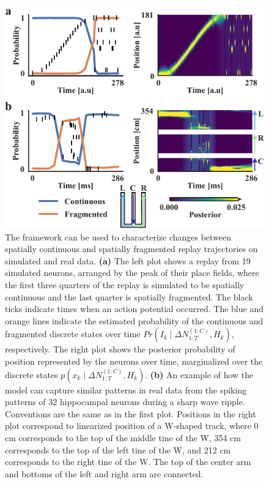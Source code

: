 \documentclass[conference]{IEEEtran}
\begin{document}
\begin{figure}[t]
\centerline{\includegraphics{fig1.pdf}}
\caption{The framework can be used to characterize changes between spatially continuous and spatially fragmented replay trajectories on simulated and real data. \textbf{(a)} The left plot shows a replay from 19 simulated neurons, arranged by the peak of their place fields, where the first three quarters of the replay is simulated to be spatially continuous and the last quarter is spatially fragmented. The black ticks indicate times when an action potential occurred. The blue and orange lines indicate the estimated probability of the continuous and fragmented discrete states over time $Pr(I_{k} \mid \Delta N_{1:T}^{(1:C)}, H_{k})$, respectively. The right plot shows the posterior probability of position represented by the neurons over time, marginalized over the discrete states $p(x_{k} \mid \Delta N_{1:T}^{(1:C)}, H_{k})$. \textbf{(b)} An example of how the model can capture similar patterns in real data from the spiking patterns of 32 hippocampal neurons during a sharp wave ripple. Conventions are the same as in the first plot. Positions in the right plot correspond to linearized position of a W-shaped track, where 0 cm corresponds to the top of the middle tine of the W, 354 cm corresponds to the top of the left tine of the W, and 212 cm corresponds to the right tine of the W. The top of the center arm and bottoms of the left and right arm are connected.}
\label{fig1}
\end{figure}
\end{document}
